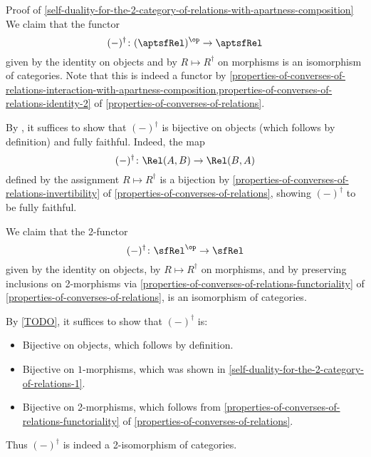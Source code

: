\begin{Proof}{Proof of \cref{self-duality-for-the-2-category-of-relations-with-apartness-composition}}%
    We claim that the functor
    \[
        (-)^{\dagger}%
        \colon%
        (\aptsfRel)^{\op}%
        \to%
        \aptsfRel%
    \]%
    given by the identity on objects and by $R\mapsto R^{\dagger}$ on morphisms is an isomorphism of categories. Note that this is indeed a functor by \cref{properties-of-converses-of-relations-interaction-with-apartness-composition,properties-of-converses-of-relations-identity-2} of \cref{properties-of-converses-of-relations}.

    \indent By , it suffices to show that $(-)^{\dagger}$ is bijective on objects (which follows by definition) and fully faithful. Indeed, the map
    \[
        (-)^{\dagger}%
        \colon%
        \Rel(A,B)%
        \to%
        \Rel(B,A)%
    \]%
    defined by the assignment $R\mapsto R^{\dagger}$ is a bijection by \cref{properties-of-converses-of-relations-invertibility} of \cref{properties-of-converses-of-relations}, showing $(-)^{\dagger}$ to be fully faithful.

    We claim that the 2-functor
    \[
        (-)^{\dagger}%
        \colon%
        \sfRel^{\op}%
        \to%
        \sfRel%
    \]%
    given by the identity on objects, by $R\mapsto R^{\dagger}$ on morphisms, and by preserving inclusions on 2-morphisms via \cref{properties-of-converses-of-relations-functoriality} of \cref{properties-of-converses-of-relations}, is an isomorphism of categories.

    \indent By \cref{TODO}, it suffices to show that $(-)^{\dagger}$ is:
    \begin{itemize}
        \item Bijective on objects, which follows by definition.
        \item Bijective on $1$-morphisms, which was shown in \cref{self-duality-for-the-2-category-of-relations-1}.
        \item Bijective on 2-morphisms, which follows from \cref{properties-of-converses-of-relations-functoriality} of \cref{properties-of-converses-of-relations}.
    \end{itemize}
    Thus $(-)^{\dagger}$ is indeed a 2-isomorphism of categories.
\end{Proof}
